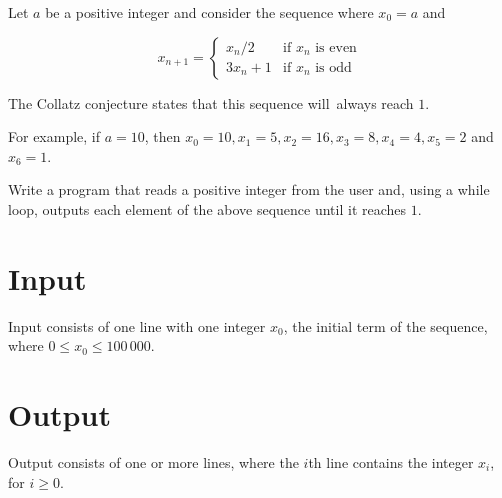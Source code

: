 
Let $a$ be a positive integer and consider the sequence where $x_0 = a$ and 

$$ x_{n+1} =
\begin{cases}
    x_n / 2     & \text{if } x_n \text{ is even} \\
    3 x_n + 1 & \text{if } x_n \text{ is odd}
\end{cases}
$$

The Collatz conjecture states that this sequence will always reach $1$.

For example, if $a = 10$, then $x_0 = 10, x_1 = 5, x_2 = 16, x_3 = 8, x_4 = 4, x_5 = 2$ and $x_6 = 1$.

Write a program that reads a positive integer from the user and, using a while loop, outputs each element of the above sequence until it reaches $1$.


\section*{Input}
Input consists of one line with one integer $x_0$, the initial term of the sequence, where $0 \leq x_0 \leq 100\,000$.

\section*{Output}

Output consists of one or more lines, where the $i$th line contains the integer $x_i$, for $i \geq 0$.
